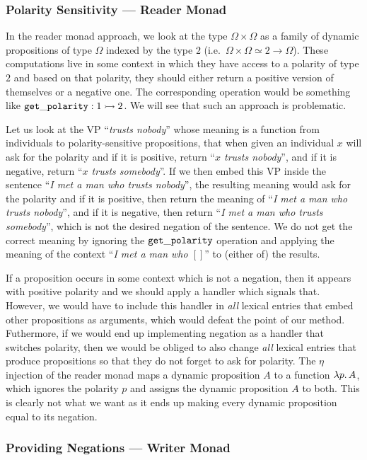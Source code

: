\subsubsection{Polarity Sensitivity --- Reader Monad}

In the reader monad approach, we look at the type $\Omega \times \Omega$ as
a family of dynamic propositions of type $\Omega$ indexed by the type $2$
(i.e.\ $\Omega \times \Omega \simeq 2 \to \Omega$). These computations live
in some context in which they have access to a polarity of type $2$ and
based on that polarity, they should either return a positive version of
themselves or a negative one. The corresponding operation would be
something like $\mathtt{get\_polarity} : 1 \rightarrowtail 2$. We will see that such an
approach is problematic.

Let us look at the VP ``\emph{trusts nobody}'' whose meaning is a function
from individuals to polarity-sensitive propositions, that when given an
individual $x$ will ask for the polarity and if it is positive, return
``\emph{$x$ trusts nobody}'', and if it is negative, return ``\emph{$x$
  trusts somebody}''. If we then embed this VP inside the sentence
``\emph{I met a man who trusts nobody}'', the resulting meaning would ask
for the polarity and if it is positive, then return the meaning of
``\emph{I met a man who trusts nobody}'', and if it is negative, then
return ``\emph{I met a man who trusts somebody}'', which is not the desired
negation of the sentence. We do not get the correct meaning by ignoring the
$\mathtt{get\_polarity}$ operation and applying the meaning of the context
``\emph{I met a man who $[]$}'' to (either of) the results.

If a proposition occurs in some context which is not a negation, then it
appears with positive polarity and we should apply a handler which signals
that. However, we would have to include this handler in \emph{all} lexical
entries that embed other propositions as arguments, which would defeat the
point of our method. Futhermore, if we would end up implementing negation
as a handler that switches polarity, then we would be obliged to also
change \emph{all} lexical entries that produce propositions so that they do
not forget to ask for polarity. The $\eta$ injection of the reader monad
maps a dynamic proposition $A$ to a function $\lambda p.\, A$, which ignores
the polarity $p$ and assigns the dynamic proposition $A$ to both. This is
clearly not what we want as it ends up making every dynamic proposition
equal to its negation.


\subsubsection{Providing Negations --- Writer Monad}

